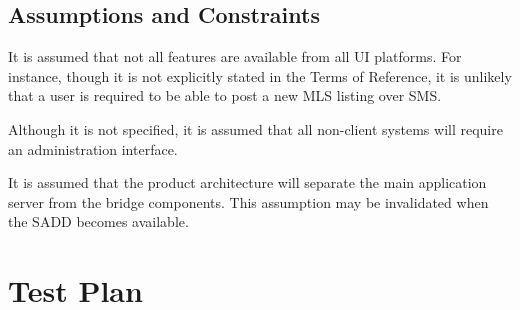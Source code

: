 \documentclass[11pt]{report}
\begin{document}
\section {Assumptions and Constraints}
It is assumed that not all features are available from all UI platforms.  For instance, though it is
not explicitly stated in the Terms of Reference, it is unlikely that a user is required to be able
to post a new MLS listing over SMS.

Although it is not specified, it is assumed that all non-client systems will require an
administration interface.

It is assumed that the product architecture will separate the main application server from the
bridge components.  This assumption may be invalidated when the SADD becomes available.


\chapter{Test Plan}
\end{document}
